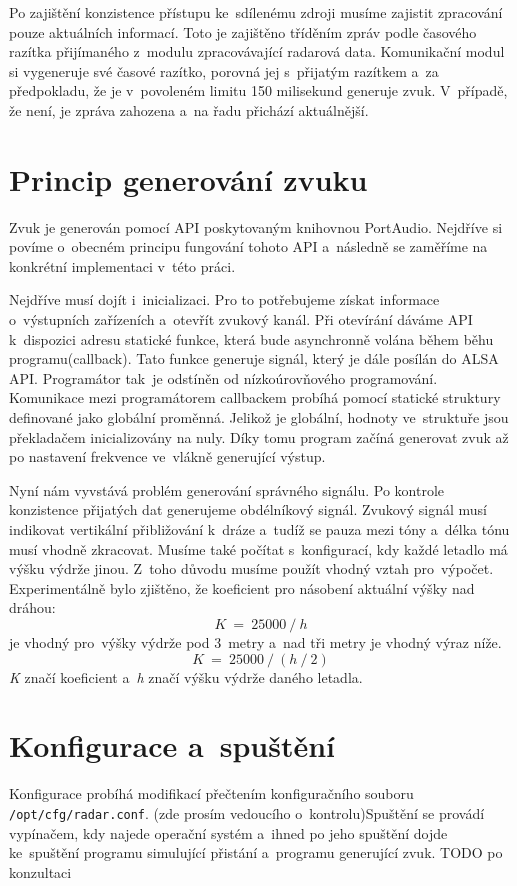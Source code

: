 	Po zajištění konzistence přístupu ke~sdílenému zdroji musíme zajistit zpracování pouze aktuálních informací. Toto je zajištěno tříděním zpráv podle časového razítka přijímaného z~modulu zpracovávající radarová data. Komunikační modul si vygeneruje své časové razítko, porovná jej s~přijatým razítkem a~za předpokladu, že je v~povoleném limitu 150 milisekund generuje zvuk. V~případě, že není, je zpráva zahozena a~na řadu přichází aktuálnější.
 	
	\section{Princip generování zvuku}
	Zvuk je generován pomocí API poskytovaným knihovnou PortAudio. Nejdříve si povíme o~obecném principu fungování tohoto API a~následně se zaměříme na konkrétní implementaci v~této práci.\par
	Nejdříve musí dojít i~inicializaci. Pro to potřebujeme získat informace o~výstupních zařízeních a~otevřít zvukový kanál. Při otevírání dáváme API k~dispozici adresu statické funkce, která bude asynchronně volána během běhu programu(callback). Tato funkce generuje signál, který je dále posílán do ALSA API. Programátor tak~je odstíněn od nízkoúrovňového programování. Komunikace mezi programátorem callbackem probíhá pomocí statické struktury definované jako globální proměnná. Jelikož je globální, hodnoty ve~struktuře jsou překladačem inicializovány na nuly. Díky tomu program začíná generovat zvuk až po nastavení frekvence ve~vlákně generující výstup.\par
	Nyní nám vyvstává problém generování správného signálu. Po kontrole konzistence přijatých dat generujeme obdélníkový signál. Zvukový signál musí indikovat vertikální přibližování k~dráze a~tudíž se pauza mezi tóny a~délka tónu musí vhodně zkracovat. Musíme také počítat s~konfigurací, kdy každé letadlo má výšku výdrže jinou. Z~toho důvodu musíme použít vhodný vztah pro~výpočet. Experimentálně bylo zjištěno, že koeficient pro násobení aktuální výšky nad dráhou: \[K~=~25000~/~h\] je vhodný pro~výšky výdrže pod 3~metry a~nad tři metry je vhodný výraz níže. \[K~=~25000~/~(h~/~2)\]
	\textit{K} značí koeficient a~\textit{h} značí výšku výdrže daného letadla.
	
	\section{Konfigurace a~spuštění}
	Konfigurace probíhá modifikací přečtením konfiguračního souboru \texttt{/opt/cfg/radar.conf}. (zde prosím vedoucího o~kontrolu)Spuštění se provádí vypínačem, kdy najede operační systém a~ihned po jeho spuštění dojde ke~spuštění programu simulující přistání a~programu generující zvuk.
	TODO po konzultaci
	
